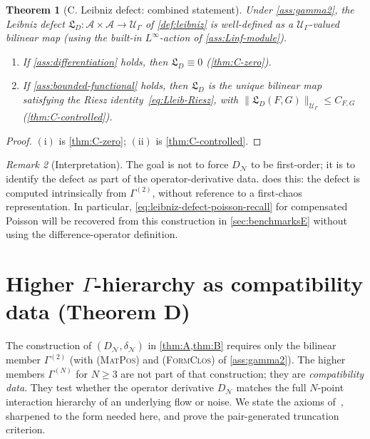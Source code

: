 \documentclass[11pt,reqno]{amsart}
\theoremstyle{plain}
\newtheorem{theorem}{Theorem}[section]
\theoremstyle{definition}
\theoremstyle{remark}
\newtheorem{remark}[theorem]{Remark}
\newcommand{\cA}{\mathcal A}
\newcommand{\cN}{\mathcal N}
\newcommand{\cU}{\mathcal U}
\newcommand{\dN}{D_{\cN}}
\newcommand{\divN}{\delta_{\cN}}
\newcommand{\Lleib}{\mathfrak L}
\begin{document}
\begin{theorem}[C. Leibniz defect: combined statement]\label{thm:C}
Under \cref{ass:gamma2}, the Leibniz defect
$\Lleib_{D}\colon\cA\times\cA\to\cU_{\Gamma}$ of
\cref{def:leibniz} is well-defined as a $\cU_{\Gamma}$-valued
bilinear map (using the built-in $L^{\infty}$-action of
\cref{ass:Linf-module}).
\begin{enumerate}
\item[$(\mathrm i)$] If \cref{ass:differentiation} holds, then
$\Lleib_{D}\equiv 0$ (\cref{thm:C-zero}).
\item[$(\mathrm{ii})$] If \cref{ass:bounded-functional} holds,
then $\Lleib_{D}$ is the unique bilinear map satisfying the
Riesz identity~\eqref{eq:Lleib-Riesz}, with
$\|\Lleib_{D}(F,G)\|_{\cU_{\Gamma}}\le C_{F,G}$
(\cref{thm:C-controlled}).
\end{enumerate}
\end{theorem}

\begin{proof}
$(\mathrm i)$ is \cref{thm:C-zero}; $(\mathrm{ii})$ is
\cref{thm:C-controlled}.
\end{proof}

\begin{remark}[Interpretation]\label{rem:leibniz-interpretation}
The goal is not to force $\dN$ to be first-order; it is to
identify the defect as part of the operator-derivative data.
 does this: the defect is computed intrinsically
from $\Gamma^{(2)}$, without reference to a first-chaos
representation. In particular,
\eqref{eq:leibniz-defect-poisson-recall} for compensated Poisson
will be recovered from this construction in \cref{sec:benchmarksE}
without using the difference-operator definition.
\end{remark}

\section{Higher \texorpdfstring{$\Gamma$}{Gamma}-hierarchy as compatibility data (Theorem D)}\label{sec:hierarchyD}

The construction of $(\dN,\divN)$ in
\cref{thm:A,thm:B} requires only the bilinear member
$\Gamma^{(2)}$ (with \textsc{(MatPos)} and \textsc{(FormClos)}
of \cref{ass:gamma2}). The higher members $\Gamma^{(N)}$ for
$N\ge 3$ are not part of that construction; they are
\emph{compatibility data}. They test whether the operator
derivative $\dN$ matches the full $N$-point interaction
hierarchy of an underlying flow or noise. We state the axioms
of~\cite[\S 6.4]{PrimitiveDivergence}, sharpened to the form
needed here, and prove the pair-generated truncation criterion.
\end{document}
